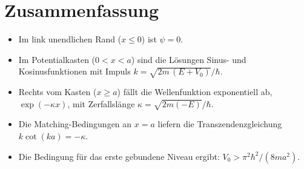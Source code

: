 \documentclass[a4paper,12pt]{article}
\begin{document}
\section*{Zusammenfassung}

\begin{itemize}
  \item Im link unendlichen Rand ($x\le0$) ist $\psi=0$.
  \item Im Potentialkasten ($0<x<a$) sind die Lösungen Sinus- und Kosinusfunktionen mit Impuls
    $k=\sqrt{2m\,(E+V_0)}/\hbar$.
  \item Rechts vom Kasten ($x\ge a$) fällt die Wellenfunktion exponentiell ab, $\exp(-\kappa x)$,
    mit Zerfallslänge $\kappa=\sqrt{2m(-E)}/\hbar$.
  \item Die Matching-Bedingungen an $x=a$ liefern die Transzendenzgleichung
    $k\cot(k a)=-\kappa$.
  \item Die Bedingung für das erste gebundene Niveau ergibt:
    $V_0 > \pi^2\hbar^2/(8 m a^2)$.
\end{itemize}
\end{document}
